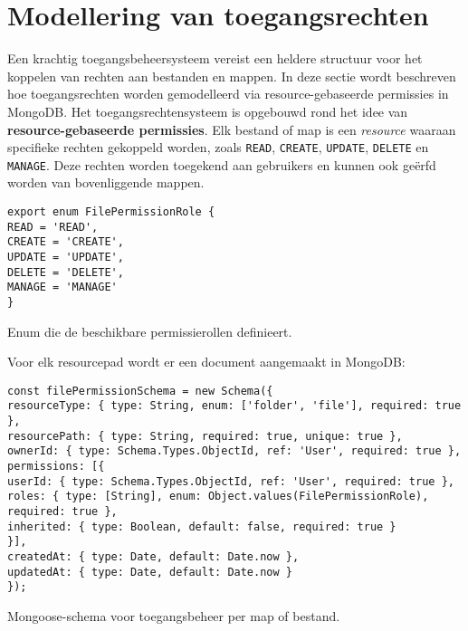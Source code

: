 \section{Modellering van toegangsrechten}
\label{sec:modellering}
Een krachtig toegangsbeheersysteem vereist een heldere structuur voor het koppelen van rechten aan bestanden en mappen. In deze sectie wordt beschreven hoe toegangsrechten worden gemodelleerd via resource-gebaseerde permissies in MongoDB.
Het toegangsrechtensysteem is opgebouwd rond het idee van \textbf{resource-gebaseerde permissies}. Elk bestand of map is een \emph{resource} waaraan specifieke rechten gekoppeld worden, zoals \texttt{READ}, \texttt{CREATE}, \texttt{UPDATE}, \texttt{DELETE} en \texttt{MANAGE}. Deze rechten worden toegekend aan gebruikers en kunnen ook geërfd worden van bovenliggende mappen.
\begin{listing}[H]
\begin{verbatim}
export enum FilePermissionRole {
READ = 'READ',
CREATE = 'CREATE',
UPDATE = 'UPDATE',
DELETE = 'DELETE',
MANAGE = 'MANAGE'
}
\end{verbatim}
\caption[Permissierollen per bestand of map]{Enum die de beschikbare permissierollen definieert.}
\end{listing}
Voor elk resourcepad wordt er een document aangemaakt in MongoDB:
\begin{listing}[H]
\begin{verbatim}
const filePermissionSchema = new Schema({
resourceType: { type: String, enum: ['folder', 'file'], required: true },
resourcePath: { type: String, required: true, unique: true },
ownerId: { type: Schema.Types.ObjectId, ref: 'User', required: true },
permissions: [{
userId: { type: Schema.Types.ObjectId, ref: 'User', required: true },
roles: { type: [String], enum: Object.values(FilePermissionRole), required: true },
inherited: { type: Boolean, default: false, required: true }
}],
createdAt: { type: Date, default: Date.now },
updatedAt: { type: Date, default: Date.now }
});
\end{verbatim}
\caption[Schema voor FilePermission documenten]{Mongoose-schema voor toegangsbeheer per map of bestand.}
\end{listing}
